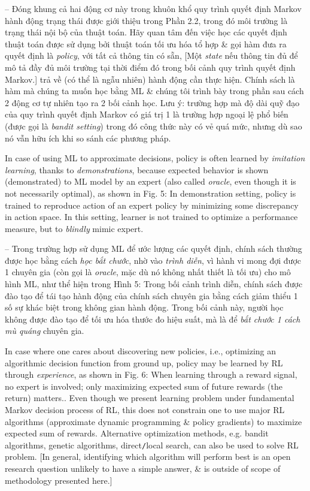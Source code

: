 \documentclass{article}
\begin{document}
\begin{itemize}
\begin{itemize}
        -- Đóng khung cả hai động cơ này trong khuôn khổ quy trình quyết định Markov hành động trạng thái được giới thiệu trong Phần 2.2, trong đó môi trường là trạng thái nội bộ của thuật toán. Hãy quan tâm đến việc học các quyết định thuật toán được sử dụng bởi thuật toán tối ưu hóa tổ hợp \& gọi hàm đưa ra quyết định là {\it policy}, với tất cả thông tin có sẵn, [Một {\it state} nếu thông tin đủ để mô tả đầy đủ môi trường tại thời điểm đó trong bối cảnh quy trình quyết định Markov.] trả về (có thể là ngẫu nhiên) hành động cần thực hiện. Chính sách là hàm mà chúng ta muốn học bằng ML \& chúng tôi trình bày trong phần sau cách 2 động cơ tự nhiên tạo ra 2 bối cảnh học. Lưu ý: trường hợp mà độ dài quỹ đạo của quy trình quyết định Markov có giá trị 1 là trường hợp ngoại lệ phổ biến (được gọi là {\it bandit setting}) trong đó công thức này có vẻ quá mức, nhưng dù sao nó vẫn hữu ích khi so sánh các phương pháp.

        In case of using ML to approximate decisions, policy is often learned by {\it imitation learning}, thanks to {\it demonstrations}, because expected behavior is shown (demonstrated) to ML model by an expert (also called {\it oracle}, even though it is not necessarily optimal), as shown in {\sf Fig. 5: In demonstration setting, policy is trained to reproduce action of an expert policy by minimizing some discrepancy in action space.} In this setting, learner is not trained to optimize a performance measure, but to {\it blindly} mimic expert.

        -- Trong trường hợp sử dụng ML để ước lượng các quyết định, chính sách thường được học bằng cách {\it học bắt chước}, nhờ vào {\it trình diễn}, vì hành vi mong đợi được 1 chuyên gia (còn gọi là {\it oracle}, mặc dù nó không nhất thiết là tối ưu) cho mô hình ML, như thể hiện trong {\sf Hình 5: Trong bối cảnh trình diễn, chính sách được đào tạo để tái tạo hành động của chính sách chuyên gia bằng cách giảm thiểu 1 số sự khác biệt trong không gian hành động.} Trong bối cảnh này, người học không được đào tạo để tối ưu hóa thước đo hiệu suất, mà là để {\it bắt chước 1 cách mù quáng} chuyên gia.

        In case where one cares about discovering new policies, i.e., optimizing an algorithmic decision function from ground up, policy may be learned by RL through {\it experience}, as shown in {\sf Fig. 6: When learning through a reward signal, no expert is involved; only maximizing expected sum of future rewards (the return) matters.}. Even though we present learning problem under fundamental Markov decision process of RL, this does not constrain one to use major RL algorithms (approximate dynamic programming \& policy gradients) to maximize expected sum of rewards. Alternative optimization methods, e.g. bandit algorithms, genetic algorithms, direct{\tt/}local search, can also be used to solve RL problem. [In general, identifying which algorithm will perform best is an open research question unlikely to have a simple answer, \& is outside of scope of methodology presented here.]


\end{itemize}
\end{itemize}
\end{document}
